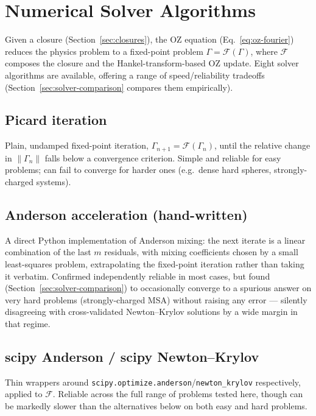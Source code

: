 \documentclass[11pt,a4paper]{article}
\newcommand{\code}[1]{\texttt{#1}}
\begin{document}
\clearpage
\section{Numerical Solver Algorithms}
\label{sec:solvers}

Given a closure (Section~\ref{sec:closures}), the OZ equation
(Eq.~\ref{eq:oz-fourier}) reduces the physics problem to a fixed-point problem
$\Gamma = \mathcal{F}(\Gamma)$, where $\mathcal{F}$ composes the closure and the
Hankel-transform-based OZ update. Eight solver algorithms are available,
offering a range of speed/reliability tradeoffs (Section~\ref{sec:solver-comparison}
compares them empirically).

\subsection{Picard iteration}
Plain, undamped fixed-point iteration, $\Gamma_{n+1}=\mathcal{F}(\Gamma_n)$,
until the relative change in $\|\Gamma_n\|$ falls below a convergence
criterion. Simple and reliable for easy problems; can fail to converge for
harder ones (e.g.\ dense hard spheres, strongly-charged systems).

\subsection{Anderson acceleration (hand-written)}
A direct Python implementation of Anderson mixing: the next iterate is a
linear combination of the last $m$ residuals, with mixing coefficients chosen
by a small least-squares problem, extrapolating the fixed-point iteration
rather than taking it verbatim. Confirmed independently reliable in most
cases, but found (Section~\ref{sec:solver-comparison}) to occasionally
converge to a spurious answer on very hard problems (strongly-charged MSA)
without raising any error --- silently disagreeing with cross-validated
Newton--Krylov solutions by a wide margin in that regime.

\subsection{scipy Anderson / scipy Newton--Krylov}
Thin wrappers around \code{scipy.optimize.anderson}/\code{newton\_krylov}
respectively, applied to $\mathcal{F}$. Reliable across the full range of
problems tested here, though can be markedly slower than the alternatives
below on both easy and hard problems.
\end{document}
